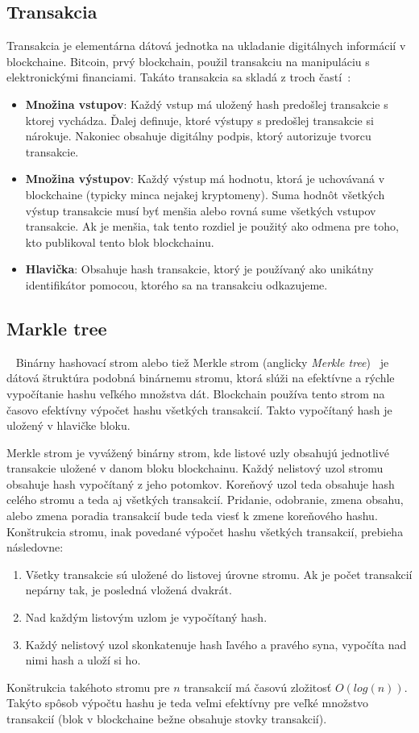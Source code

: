 \subsection{Transakcia}\label{subsec:transaction}
Transakcia je elementárna dátová jednotka na ukladanie digitálnych informácií v blockchaine. Bitcoin, prvý blockchain, použil transakciu na manipuláciu s elektronickými financiami. Takáto transakcia sa skladá z troch častí~\cite{narayanan2016bitcoin}:
\begin{itemize}
	\item \textbf{Množina vstupov}: Každý vstup má uložený hash predošlej transakcie s ktorej vychádza. Ďalej definuje, ktoré výstupy s predošlej transakcie si nárokuje. Nakoniec obsahuje digitálny podpis, ktorý autorizuje tvorcu transakcie.
	\item \textbf{Množina výstupov}: Každý výstup má hodnotu, ktorá je uchovávaná v blockchaine (typicky minca nejakej kryptomeny). Suma hodnôt všetkých výstup transakcie musí byť menšia alebo rovná sume všetkých vstupov transakcie. Ak je menšia, tak tento rozdiel je použitý ako odmena pre toho, kto publikoval tento blok blockchainu.
	\item \textbf{Hlavička}: Obsahuje hash transakcie, ktorý je používaný ako unikátny identifikátor pomocou, ktorého sa na transakciu odkazujeme.
\end{itemize}


\subsection{Markle tree}~\label{subsec:merkle-tree}
Binárny hashovací strom alebo tiež Merkle strom (anglicky \textit{Merkle tree})~\cite{merkleTreeBosamia} je dátová štruktúra podobná binárnemu stromu, ktorá slúži na efektívne a rýchle vypočítanie hashu veľkého množstva dát. Blockchain používa tento strom na časovo efektívny výpočet hashu všetkých transakcií. Takto vypočítaný hash je uložený v hlavičke bloku.

Merkle strom je vyvážený binárny strom, kde listové uzly obsahujú jednotlivé transakcie uložené v danom bloku blockchainu. Každý nelistový uzol stromu obsahuje hash vypočítaný z jeho potomkov. Koreňový uzol teda obsahuje hash celého stromu a teda aj všetkých transakcií. Pridanie, odobranie, zmena obsahu, alebo zmena poradia transakcií bude teda viesť k zmene koreňového hashu. Konštrukcia stromu, inak povedané výpočet hashu všetkých transakcií, prebieha následovne:
\begin{enumerate}
	\item Všetky transakcie sú uložené do listovej úrovne stromu. Ak je počet transakcií nepárny tak, je posledná vložená dvakrát.
	\item Nad každým listovým uzlom je vypočítaný hash.
	\item Každý nelistový uzol skonkatenuje hash ľavého a pravého syna, vypočíta nad nimi hash a uloží si ho. 
\end{enumerate}
Konštrukcia takéhoto stromu pre $n$ transakcií má časovú zložitosť $O(log(n))$. Takýto spôsob výpočtu hashu je teda veľmi efektívny pre veľké množstvo transakcií (blok v blockchaine bežne obsahuje stovky transakcií).

